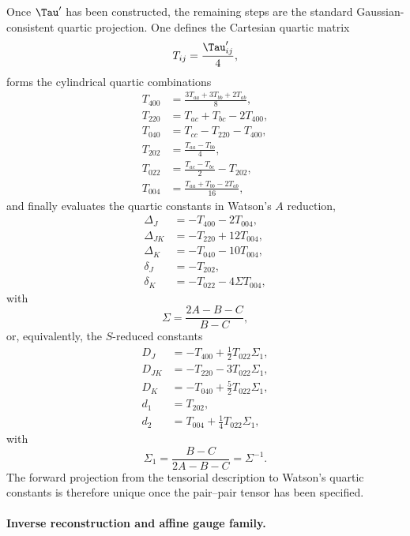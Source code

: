 Once $\Tau'$ has been constructed, the remaining steps are the standard
Gaussian-consistent quartic projection.  One defines the Cartesian quartic
matrix
\begin{equation}
T_{ij}=\frac{\Tau'_{ij}}{4},
\label{eq:T_from_tauprime}
\end{equation}
forms the cylindrical quartic combinations
\begin{align}
T_{400} &= \frac{3T_{aa}+3T_{bb}+2T_{ab}}{8}, \\
T_{220} &= T_{ac}+T_{bc}-2T_{400}, \\
T_{040} &= T_{cc}-T_{220}-T_{400}, \\
T_{202} &= \frac{T_{aa}-T_{bb}}{4}, \\
T_{022} &= \frac{T_{ac}-T_{bc}}{2}-T_{202}, \\
T_{004} &= \frac{T_{aa}+T_{bb}-2T_{ab}}{16},
\label{eq:cylindrical_quartic}
\end{align}
and finally evaluates the quartic constants in Watson's $A$ reduction,
\begin{align}
\Delta_J   &= -T_{400}-2T_{004}, \\
\Delta_{JK}&= -T_{220}+12T_{004}, \\
\Delta_K   &= -T_{040}-10T_{004}, \\
\delta_J   &= -T_{202}, \\
\delta_K   &= -T_{022}-4\Sigma T_{004},
\label{eq:watson_A_quartic}
\end{align}
with
\begin{equation}
\Sigma=\frac{2A-B-C}{B-C},
\end{equation}
or, equivalently, the $S$-reduced constants
\begin{align}
D_J   &= -T_{400}+\frac12 T_{022}\Sigma_1, \\
D_{JK}&= -T_{220}-3T_{022}\Sigma_1, \\
D_K   &= -T_{040}+\frac52 T_{022}\Sigma_1, \\
d_1   &= T_{202}, \\
d_2   &= T_{004}+\frac14 T_{022}\Sigma_1,
\label{eq:watson_S_quartic}
\end{align}
with
\begin{equation}
\Sigma_1=\frac{B-C}{2A-B-C}=\Sigma^{-1}.
\end{equation}
The forward projection from the tensorial description to Watson's quartic
constants is therefore unique once the pair--pair tensor has been specified.

\paragraph{Inverse reconstruction and affine gauge family.}

